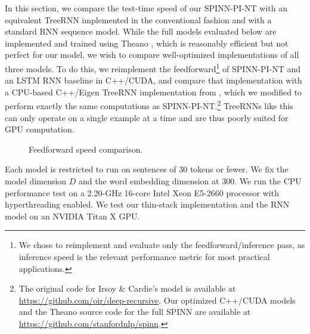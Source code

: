 \documentclass[11pt]{article}
\begin{document}
In this section, we compare the test-time speed of our SPINN-PI-NT with an equivalent TreeRNN implemented in the conventional fashion and with a standard RNN sequence model. While the full models evaluated below are implemented and trained using Theano \citep{theano}, which is reasonably efficient but not perfect for our model, we wish to compare well-optimized implementations of all three models. To do this, we reimplement the feedforward\footnote{We chose to reimplement and evaluate only the feedforward/inference pass, as inference speed is the relevant performance metric for most practical applications.} of SPINN-PI-NT and an LSTM RNN baseline in C++/CUDA, and compare that implementation with a CPU-based C++/Eigen TreeRNN implementation from \citet{irsoy2014deep}, which we modified to perform exactly the same computations as SPINN-PI-NT.\footnote{The original code for Irsoy \& Cardie's model is available at \url{https://github.com/oir/deep-recursive}. Our optimized C++/CUDA models and the Theano source code for the full SPINN are available at \url{https://github.com/stanfordnlp/spinn}.} TreeRNNs like this can only operate on a single example at a time and are thus poorly suited for GPU computation.

\begin{figure}
\centering
{}
\caption{Feedforward speed comparison.}
\label{fig:speed}
\end{figure}


Each model is restricted to run on sentences of 30 tokens or fewer. We fix the model dimension $D$ and the word embedding dimension at 300. We run the CPU performance test on a 2.20-GHz 16-core Intel Xeon E5-2660 processor with hyperthreading enabled. We test our thin-stack implementation and the RNN model on an NVIDIA Titan X GPU.
\end{document}
